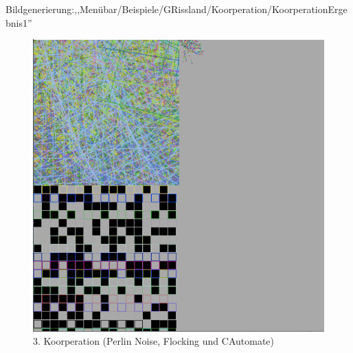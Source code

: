 \documentclass[../mciAusarbeitung.tex]{subfiles}
\begin{document}
 Bildgenerierung:,,Menübar/Beispiele/GRissland/Koorperation/KoorperationErgebnis1''\\
   \begin{figure}[H]
\centering
\includegraphics[width=0.5\linewidth]{"kooperation_perlinnoise_flocking_cautomate_Mode-2-2_iteration50.png"}
\caption[Koorperation-Beispiel3]{3. Koorperation (Perlin Noise, Flocking und CAutomate)}
\end{figure} 
\newpage	
\end{document}
